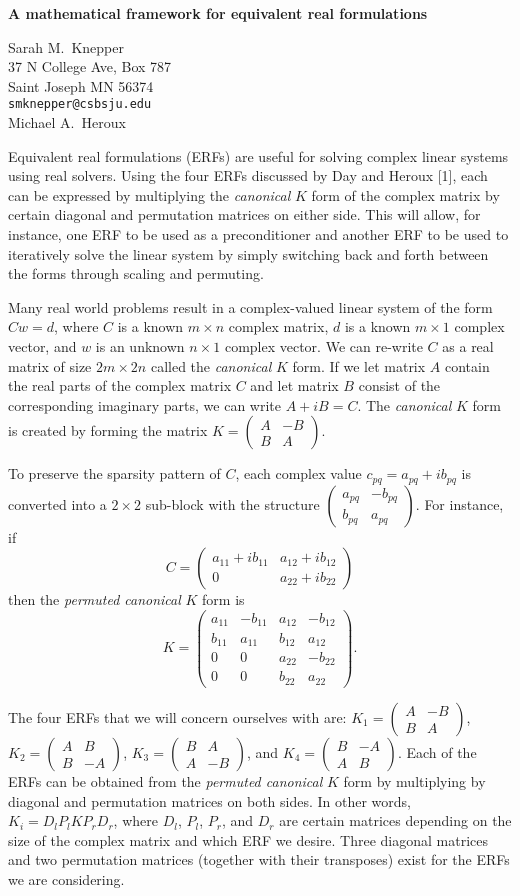 \documentclass{report}
\newcommand{\Matrr}[4]{ \left(
	\begin{array}{cc}
	#1 & #2 \\
	#3 & #4
	\end{array}
	\right) }
\begin{document}

\begin{center}
{\large
{\bf A mathematical framework for equivalent real formulations}}

	Sarah M.~Knepper \\
	37 N College Ave, Box 787 \\
	Saint Joseph MN 56374 \\
	{\tt smknepper@csbsju.edu} \\
	Michael A.~Heroux
\end{center}
Equivalent real formulations (ERFs) are useful for solving
complex linear systems using real solvers. Using the four
ERFs discussed by Day and Heroux [1], each can be
expressed by multiplying the \emph{canonical} $K$ form of
the complex matrix by certain diagonal and permutation
matrices on either side. This will allow, for instance, one
ERF to be used as a preconditioner and another ERF to be
used to iteratively solve the linear system by simply
switching back and forth between the forms through scaling
and permuting.

Many real world problems result in a
complex-valued linear system of the form
$C w = d$, where $C$ is a known
$m\times n$ complex matrix, $d$ is a known $m\times 1$
complex vector, and $w$ is an unknown $n\times 1$
complex vector. We
can re-write $C$ as a real matrix of size $2m\times 2n$
called the \emph{canonical} $K$ form. If we let matrix $A$
contain the real parts of the complex matrix $C$ and let
matrix $B$ consist of the corresponding imaginary parts, we
can write $A + i B = C$.
The \emph{canonical} $K$ form is created by
forming the matrix
$K = \Matrr{A}{-B}{B}{A}$.

To preserve the sparsity pattern of $C$,
each complex value $c_{pq} = a_{pq} + ib_{pq}$ is converted
into a $2\times 2$ sub-block with the structure
$ \Matrr{a_{pq}}{-b_{pq}}{b_{pq}}{a_{pq}}.$
For instance, if
$$C = \Matrr{a_{11} + i b_{11}}{a_{12} + i b_{12}}{0}{a_{22} + i b_{22}}$$
then the \emph{permuted canonical} $K$ form is
$$K = \left(
\begin{array}{cccc} a_{11} & -b_{11} & a_{12} & -b_{12} \\
b_{11} & a_{11} & b_{12} & a_{12} \\ 0 & 0 & a_{22} &
-b_{22} \\ 0 & 0 & b_{22} & a_{22} \end{array} \right).
$$

The four ERFs that we will concern
ourselves with are:
$K_1 = \Matrr{A}{-B}{B}{A}$,
$K_2 = \Matrr{A}{B}{B}{-A}$,
$K_3 = \Matrr{B}{A}{A}{-B}$, and
$K_4 = \Matrr{B}{-A}{A}{B}$.
Each of the ERFs can be obtained from the
\emph{permuted canonical} $K$ form by multiplying by
diagonal and permutation matrices on both sides.
In other words,
$K_i = D_l P_l K P_r D_r$,
where $D_l$, $P_l$, $P_r$, and $D_r$ are
certain matrices depending on the size of the complex matrix
and which ERF we desire. Three diagonal matrices and two
permutation matrices (together with their transposes) exist
for the ERFs we are considering.
\end{document}
